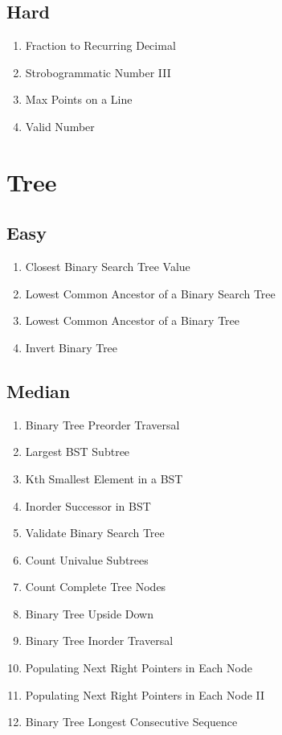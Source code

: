 \documentclass[DIV=calc, paper=a4, fontsize=11pt, twocolumn]{scrartcl}	 %
\begin{document}
\subsection*{Hard}
\begin{enumerate}
\item {\color{red} Fraction to Recurring Decimal}    \cite{166}
\item {\color{red} Strobogrammatic Number III}  \cite{248}
\item Max Points on a Line    \cite{149}
\item Valid Number   \cite{065}
\end{enumerate}


\section*{Tree}

\subsection*{Easy}
\begin{enumerate}
\item Closest Binary Search Tree Value \cite{270}
\item Lowest Common Ancestor of a Binary Search Tree \cite{235}
\item Lowest Common Ancestor of a Binary Tree \cite{236}
\item Invert Binary Tree \cite{226}
\end{enumerate}

\subsection*{Median}
\begin{enumerate}
\item Binary Tree Preorder Traversal  \cite{144}
\item Largest BST Subtree   \cite{333}
\item Kth Smallest Element in a BST  \cite{230}
\item Inorder Successor in BST    \cite{285}
\item Validate Binary Search Tree \cite{098}
\item Count Univalue Subtrees    \cite{250}
\item Count Complete Tree Nodes  \cite{222}
\item Binary Tree Upside Down  \cite{156}
\item  Binary Tree Inorder Traversal  \cite{094}
\item Populating Next Right Pointers in Each Node \cite{116}
\item Populating Next Right Pointers in Each Node II \cite{117}
\item Binary Tree Longest Consecutive Sequence   \cite{298}
\end{enumerate}
\end{document}
